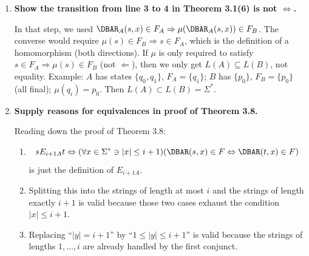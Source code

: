 \begin{enumerate}[{3.}1.]
\begin{enumerate}
\item \textit{Injective}: suppose $\psi(s)=\psi(t)$. Then for every
$z\in\Sigma^*$,
\[
x_sz\in L(B)\Leftrightarrow x_tz\in L(B),
\]
because $x_s$ and $x_t$ reach the same state in $B$. Since $L(A)=L(B)$, we also
have
\[
x_sz\in L(A)\Leftrightarrow x_tz\in L(A)
\]
for every $z$. Thus $s$ and $t$ have the same future language in $A$. Because
$A$ is reduced, $s=t$.

\textit{Surjective}: let $u\in S_B$. Since $B$ is connected, there exists
$y\in\Sigma^*$ such that $\DBAR_B(s_{0B},y)=u$. Let
$s=\DBAR_A(s_{0A},y)$. Then $y$ is one of the strings reaching $s$, so by the
definition of $\psi$ and well-definedness,
\[
\psi(s)=\DBAR_B(s_{0B},y)=u.
\]
Hence $\psi$ is surjective.
\end{enumerate}

\item \textbf{Show the transition from line 3 to 4 in Theorem 3.1(6) is not $\Leftrightarrow$.}

In that step, we used $\DBAR_A(s,x)\in F_A\Rightarrow\mu(\DBAR_A(s,x))\in F_B$. The converse would require $\mu(s)\in F_B\Rightarrow s\in F_A$, which is the definition of a homomorphism (both directions). If $\mu$ is only required to satisfy $s\in F_A\Rightarrow\mu(s)\in F_B$ (not $\Leftarrow$), then we only get $L(A)\subseteq L(B)$, not equality. Example: $A$ has states $\{q_0,q_1\}$, $F_A=\{q_1\}$; $B$ has $\{p_0\}$, $F_B=\{p_0\}$ (all final); $\mu(q_i)=p_0$. Then $L(A)\subset L(B)=\Sigma^*$.

\item \textbf{Supply reasons for equivalences in proof of Theorem 3.8.}

Reading down the proof of Theorem 3.8:
\begin{enumerate}
\item
\[
sE_{i+1A}t \Leftrightarrow
(\forall x\in\Sigma^* \ni |x|\leq i+1)(\DBAR(s,x)\in F \Leftrightarrow \DBAR(t,x)\in F)
\]
is just the definition of $E_{i+1A}$.

\item Splitting this into the strings of length at most $i$ and the strings of
length exactly $i+1$ is valid because those two cases exhaust the condition
$|x|\leq i+1$.

\item Replacing ``$|y|=i+1$'' by ``$1\leq |y|\leq i+1$'' is valid because the
strings of lengths $1,\dots,i$ are already handled by the first conjunct.


\end{enumerate}
\end{enumerate}
